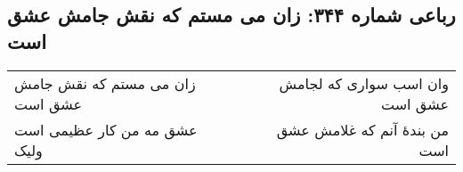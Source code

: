 \begin{center}
\section*{رباعی شماره ۳۴۴: زان می مستم که نقش جامش عشق است}
\label{sec:0344}
\begin{longtable}{l p{0.5cm} r}
زان می مستم که نقش جامش عشق است
&&
وان اسب سواری که لجامش عشق است
\\
عشق مه من کار عظیمی است ولیک
&&
من بندهٔ آنم که غلامش عشق است
\\
\end{longtable}
\end{center}
